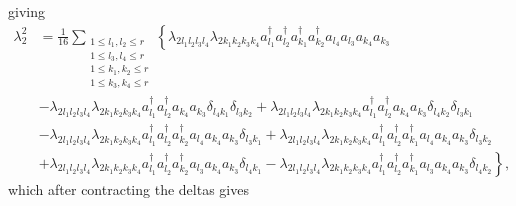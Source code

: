 \documentclass[aps,preprint]{revtex4}%
\begin{document}
giving%
\begin{align}
\lambda_{2}^{2}  &  =\frac{1}{16}\sum_{\substack{1\leq l_{1},l_{2}\leq
r\\1\leq l_{3},l_{4}\leq r\\1\leq k_{1},k_{2}\leq r\\1\leq k_{3},k_{4}\leq
r}}\left\{  \lambda_{2l_{1}l_{2}l_{3}l_{4}}\lambda_{2k_{1}k_{2}k_{3}k_{4}%
}a_{l_{1}}^{\dagger}a_{l_{2}}^{\dagger}a_{k_{1}}^{\dagger}a_{k_{2}}^{\dagger
}a_{l_{4}}a_{l_{3}}a_{k_{4}}a_{k_{3}}\right. \nonumber\\
&  -\lambda_{2l_{1}l_{2}l_{3}l_{4}}\lambda_{2k_{1}k_{2}k_{3}k_{4}}a_{l_{1}%
}^{\dagger}a_{l_{2}}^{\dagger}a_{k_{4}}a_{k_{3}}\delta_{l_{4}k_{1}}%
\delta_{l_{3}k_{2}}+\lambda_{2l_{1}l_{2}l_{3}l_{4}}\lambda_{2k_{1}k_{2}%
k_{3}k_{4}}a_{l_{1}}^{\dagger}a_{l_{2}}^{\dagger}a_{k_{4}}a_{k_{3}}%
\delta_{l_{4}k_{2}}\delta_{l_{3}k_{1}}\nonumber\\
&  -\lambda_{2l_{1}l_{2}l_{3}l_{4}}\lambda_{2k_{1}k_{2}k_{3}k_{4}}a_{l_{1}%
}^{\dagger}a_{l_{2}}^{\dagger}a_{k_{2}}^{\dagger}a_{l_{4}}a_{k_{4}}a_{k_{3}%
}\delta_{l_{3}k_{1}}+\lambda_{2l_{1}l_{2}l_{3}l_{4}}\lambda_{2k_{1}k_{2}%
k_{3}k_{4}}a_{l_{1}}^{\dagger}a_{l_{2}}^{\dagger}a_{k_{1}}^{\dagger}a_{l_{4}%
}a_{k_{4}}a_{k_{3}}\delta_{l_{3}k_{2}}\nonumber\\
&  \left.  +\lambda_{2l_{1}l_{2}l_{3}l_{4}}\lambda_{2k_{1}k_{2}k_{3}k_{4}%
}a_{l_{1}}^{\dagger}a_{l_{2}}^{\dagger}a_{k_{2}}^{\dagger}a_{l_{3}}a_{k_{4}%
}a_{k_{3}}\delta_{l_{4}k_{1}}-\lambda_{2l_{1}l_{2}l_{3}l_{4}}\lambda
_{2k_{1}k_{2}k_{3}k_{4}}a_{l_{1}}^{\dagger}a_{l_{2}}^{\dagger}a_{k_{1}%
}^{\dagger}a_{l_{3}}a_{k_{4}}a_{k_{3}}\delta_{l_{4}k_{2}}\right\}  ,
\end{align}
which after contracting the deltas gives%
\end{document}
